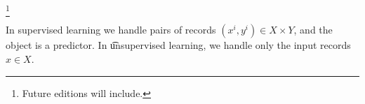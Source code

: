 
  \ifhmode\unskip\fi\footnote{
Future editions will include.
  }

In supervised learning we handle pairs of records $(x^i, y^i) \in X \times  Y$, and the object is a predictor.
In \t{unsupervised learning}, we handle only the input records $x \in X$.

\blankpage
